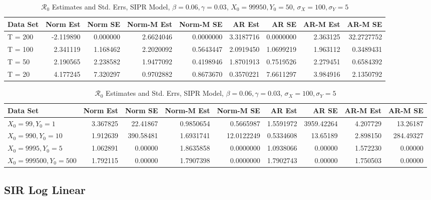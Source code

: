 \documentclass[12pt]{article}
\newcommand{\rr}{\ensuremath{\mathcal{R}_0}}
\begin{document}
\begin{table}[H]
	
	\caption{\label{tab:}$\rr$ Estimates and Std. Errs, SIPR Model,
		$\beta = 0.06, \gamma = 0.03$, $X_0 = 99950, Y_0 = 50$, $\sigma_X = 100, \sigma_Y = 5$}
	\centering
	\begin{tabular}[t]{l|r|r|r|r|r|r|r|r}
		\hline
		Data Set & Norm Est & Norm SE & Norm-M Est & Norm-M SE & AR Est & AR SE & AR-M Est & AR-M SE\\
		\hline
		T = 200 & -2.119890 & 0.000000 & 2.6624046 & 0.0000000 & 3.3187716 & 0.0000000 & 2.363125 & 32.2727752\\
		\hline
		T = 100 & 2.341119 & 1.168462 & 2.2020092 & 0.5643447 & 2.0919450 & 1.0699219 & 1.963112 & 0.3489431\\
		\hline
		T = 50 & 2.190565 & 2.238582 & 1.9477092 & 0.4198946 & 1.8701913 & 0.7519526 & 2.279451 & 0.6584392\\
		\hline
		T = 20 & 4.177245 & 7.320297 & 0.9702882 & 0.8673670 & 0.3570221 & 7.6611297 & 3.984916 & 2.1350792\\
		\hline
	\end{tabular}
\end{table}

\begin{table}[H]
	
	\caption{\label{tab:}$\rr$ Estimates and Std. Errs, SIPR Model,
		$\beta = 0.06, \gamma = 0.03$, $\sigma_X = 100, \sigma_Y = 5$}
	\centering
	\begin{tabular}[t]{l|r|r|r|r|r|r|r|r}
		\hline
		Data Set & Norm Est & Norm SE & Norm-M Est & Norm-M SE & AR Est & AR SE & AR-M Est & AR-M SE\\
		\hline
		$X_0 = 99, Y_0 = 1$ & 3.367825 & 22.41867 & 0.9850654 & 0.5665987 & 1.5591972 & 3959.42264 & 4.207729 & 13.26187\\
		\hline
		$X_0 = 990, Y_0 = 10$ & 1.912639 & 390.58481 & 1.6931741 & 12.0122249 & 0.5334608 & 13.65189 & 2.898150 & 284.49327\\
		\hline
		$X_0 = 9995, Y_0 = 5$ & 1.062891 & 0.00000 & 1.8635858 & 0.0000000 & 1.0938066 & 0.00000 & 1.572230 & 0.00000\\
		\hline
		$X_0 = 999500, Y_0 = 500$ & 1.792115 & 0.00000 & 1.7907398 & 0.0000000 & 1.7902743 & 0.00000 & 1.750503 & 0.00000\\
		\hline
	\end{tabular}
\end{table}

\subsection{SIR Log Linear}
\end{document}

